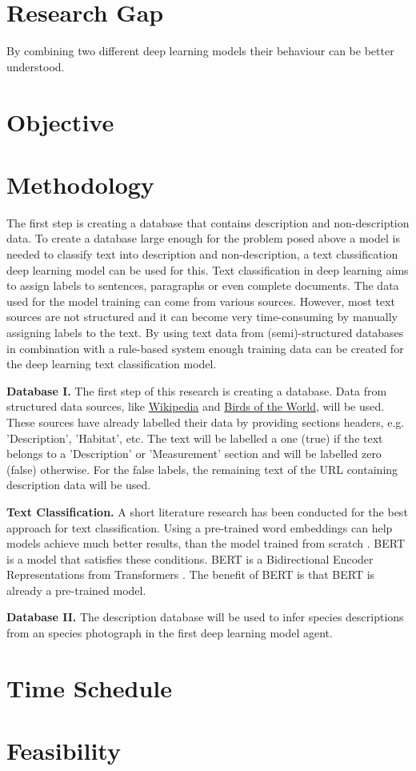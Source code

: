 \documentclass{article}
\begin{document}

\section{Research Gap}
By combining two different deep learning models their behaviour can be better understood.

\section{Objective}

\section{Methodology}
The first step is creating a database that contains description and non-description data.
To create a database large enough for the problem posed above a model is needed to classify text into description and non-description, a text classification deep learning model can be used for this.
Text classification in deep learning aims to assign labels to sentences, paragraphs or even complete documents. 
The data used for the model training can come from various sources. 
However, most text sources are not structured and it can become very time-consuming by manually assigning labels to the text.
By using text data from (semi)-structured databases in combination with a rule-based system enough training data can be created for the deep learning text classification model.
\newline

\noindent
\textbf{Database I.}
The first step of this research is creating a database.
Data from structured data sources, like \href{http://www.Wikipedia.com}{Wikipedia} and \href{https://birdsoftheworld.org}{Birds of the World}, will be used.
These sources have already labelled their data by providing sections headers, e.g. 'Description', 'Habitat', etc.
The text will be labelled a one (true) if the text belongs to a 'Description' or 'Measurement' section and will be labelled zero (false) otherwise.
For the false labels, the remaining text of the URL containing description data will be used.
\newline

\noindent
\textbf{Text Classification.}
A short literature research has been conducted for the best approach for text classification.
Using a pre-trained word embeddings can help models achieve much better results, than the model trained from scratch \cite{mikolov_distributed_2013}.   
BERT is a model that satisfies these conditions.
BERT is a Bidirectional Encoder Representations from Transformers \cite{devlin_bert_2019}.
The benefit of BERT is that BERT is already a pre-trained model.
\newline

\noindent
\textbf{Database II.}
The description database will be used to infer species descriptions from an species photograph in the first deep learning model agent.


\section{Time Schedule}
\section{Feasibility}

\printbibliography
\end{document}
